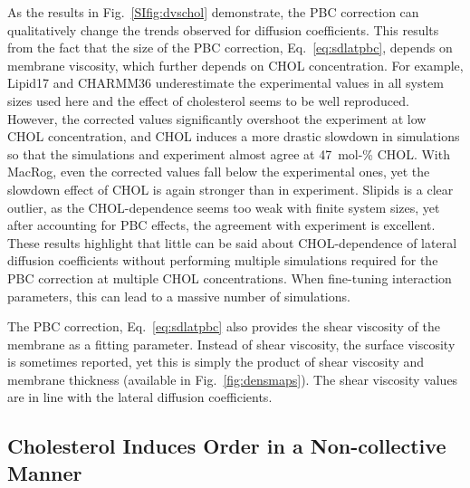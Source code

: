\documentclass[aps,prl,superscriptaddress]{revtex4-2}
\begin{document}
As the results in Fig.~\ref{SIfig:dvschol} demonstrate, the PBC correction can qualitatively change the trends observed for diffusion coefficients. This results from the fact that the size of the PBC correction, Eq.~\eqref{eq:sdlatpbc}, depends on membrane viscosity, which further depends on CHOL concentration. For example, Lipid17 and CHARMM36 underestimate the experimental values in all system sizes used here and the effect of cholesterol seems to be well reproduced. However, the corrected values significantly overshoot the experiment at low CHOL concentration, and CHOL induces a more drastic slowdown in simulations so that the simulations and experiment almost agree at 47~mol-\% CHOL. With MacRog, even the corrected values fall below the experimental ones, yet the slowdown effect of CHOL is again stronger than in experiment. Slipids is a clear outlier, as the CHOL-dependence seems too weak with finite system sizes, yet after accounting for PBC effects, the agreement with experiment is excellent. These results highlight that little can be said about CHOL-dependence of lateral diffusion coefficients without performing multiple simulations required for the PBC correction at multiple CHOL concentrations. When fine-tuning interaction parameters, this can lead to a massive number of simulations.

The PBC correction, Eq.~\eqref{eq:sdlatpbc} also provides the shear viscosity of the membrane as a fitting parameter. Instead of shear viscosity, the surface viscosity is sometimes reported, yet this is simply the product of shear viscosity and membrane thickness (available in Fig.~\ref{fig:densmaps}). The shear viscosity values are in line with the lateral diffusion coefficients. 

\subsection{Cholesterol Induces Order in a Non-collective Manner}
\end{document}
